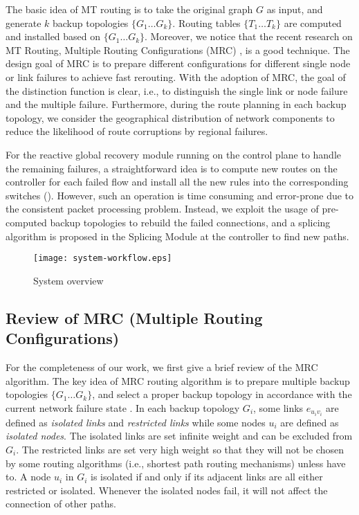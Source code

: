 \documentclass[10pt,journal]{IEEEtran}
\begin{document}
The basic idea of MT routing is to take the original graph $G$ as input, and generate $k$ backup topologies $\{G_1 \ldots G_k\}$. Routing tables $\{T_1 \ldots T_k\}$ are computed and installed based on $\{G_1 \ldots G_k\}$. Moreover, we notice that the recent research on MT Routing, Multiple Routing Configurations (MRC) \cite{kvalbein2009multiple,kvalbein2006fast}, is a good technique. The design goal of MRC is to prepare different configurations for different single node or link failures to achieve fast rerouting. With the adoption of MRC, the goal of the distinction function is clear, i.e., to distinguish the single link or node failure and the multiple failure. Furthermore, during the route planning in each backup topology, we consider the geographical distribution of network components to reduce the likelihood of route corruptions by regional failures.

For the reactive global recovery module running on the control plane to handle the remaining failures, a straightforward idea is to compute new routes on the controller for each failed flow and install all the new rules into the corresponding switches (\cite{staessens2011software,sharma2012openflow,nguyen2013software}). However, such an operation is time consuming and error-prone due to the consistent packet processing problem\cite{katta2013incremental,peresini2013cpp}. Instead, we exploit the usage of pre-computed backup topologies to rebuild the failed connections, and a splicing algorithm is proposed in the Splicing Module at the controller to find new paths.

\begin{figure}[!h]
\begin{center}
		\texttt{[image: system-workflow.eps]}
	\caption{System overview}
	\label{fig:system_workflow}
\end{center}
\end{figure}
\subsection{Review of MRC (Multiple Routing Configurations)}
For the completeness of our work, we first give a brief review of the MRC algorithm. The key idea of MRC routing algorithm is to prepare multiple backup topologies $\{G_1 \ldots G_k\}$, and select a proper backup topology in accordance with the current network failure state \cite{kvalbein2006fast}. In each backup topology $G_i$, some links $e_{u_{i}v_{i}}$ are defined as \emph{isolated links} and  \emph{restricted links} while some nodes $u_i$ are defined as \emph{isolated nodes}. The isolated links are set infinite weight and can be excluded from $G_i$. The restricted links are set very high weight so that they will not be chosen by some routing algorithms (i.e., shortest path routing mechanisms) unless have to. A node $u_i$ in $G_i$ is isolated if and only if its adjacent links are all either restricted or isolated.  Whenever the isolated nodes fail, it will not affect the connection of other paths.
\end{document}
